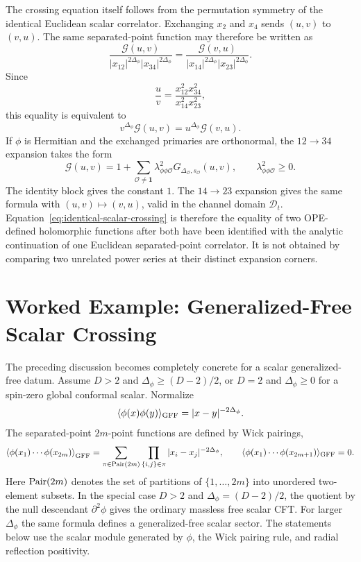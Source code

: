 The crossing equation itself follows from the permutation symmetry of the
identical Euclidean scalar correlator.  Exchanging \(x_2\) and \(x_4\) sends
\((u,v)\) to \((v,u)\).  The same separated-point function may therefore be
written as
\[
  \frac{\mathcal G(u,v)}
       {|x_{12}|^{2\Delta_\phi}|x_{34}|^{2\Delta_\phi}}
  =
  \frac{\mathcal G(v,u)}
       {|x_{14}|^{2\Delta_\phi}|x_{23}|^{2\Delta_\phi}} .
\]
Since
\[
  \frac{u}{v}
  =
  \frac{x_{12}^2x_{34}^2}{x_{14}^2x_{23}^2},
\]
this equality is equivalent to
\begin{equation}
  v^{\Delta_\phi}\mathcal G(u,v)
  =
  u^{\Delta_\phi}\mathcal G(v,u).
  \label{eq:identical-scalar-crossing}
\end{equation}
If \(\phi\) is Hermitian and the exchanged primaries are orthonormal, the
\(12\to34\) expansion takes the form
\begin{equation}
  \mathcal G(u,v)
  =
  1+
  \sum_{\mathcal O\ne\mathbf 1}
  \lambda_{\phi\phi\mathcal O}^2
  G_{\Delta_{\mathcal O},s_{\mathcal O}}(u,v),
  \qquad
  \lambda_{\phi\phi\mathcal O}^2\ge0.
  \label{eq:identical-scalar-positive-block-expansion}
\end{equation}
The identity block gives the constant \(1\).  The \(14\to23\) expansion gives
the same formula with \((u,v)\mapsto(v,u)\), valid in the channel domain
\(\mathcal D_t\).  Equation~\eqref{eq:identical-scalar-crossing} is therefore
the equality of two OPE-defined holomorphic functions after both have been
identified with the analytic continuation of one Euclidean separated-point
correlator.  It is not obtained by comparing two unrelated power series at
their distinct expansion corners.

\section{Worked Example: Generalized-Free Scalar Crossing}
\label{sec:gff-four-point-crossing}

The preceding discussion becomes completely concrete for a scalar
generalized-free datum.  Assume \(D>2\) and
\(\Delta_\phi\ge (D-2)/2\), or \(D=2\) and \(\Delta_\phi\ge0\) for a spin-zero
global conformal scalar.  Normalize
\[
  \langle \phi(x)\phi(y)\rangle_{\rm GFF}
  =
  |x-y|^{-2\Delta_\phi}.
\]
The separated-point \(2m\)-point functions are defined by Wick pairings,
\begin{equation}
  \left\langle
    \phi(x_1)\cdots\phi(x_{2m})
  \right\rangle_{\rm GFF}
  =
  \sum_{\pi\in{\rm Pair}(2m)}
  \prod_{\{i,j\}\in\pi}|x_i-x_j|^{-2\Delta_\phi},
  \qquad
  \langle \phi(x_1)\cdots\phi(x_{2m+1})\rangle_{\rm GFF}=0 .
  \label{eq:gff-wick-definition}
\end{equation}
Here \({\rm Pair}(2m)\) denotes the set of partitions of
\(\{1,\ldots,2m\}\) into unordered two-element subsets.  In the special case
\(D>2\) and \(\Delta_\phi=(D-2)/2\), the quotient by the null descendant
\(\partial^2\phi\) gives the ordinary massless free scalar CFT.  For larger
\(\Delta_\phi\) the same formula defines a generalized-free scalar sector.
The statements below use the scalar module generated by \(\phi\), the Wick
pairing rule, and radial reflection positivity.

